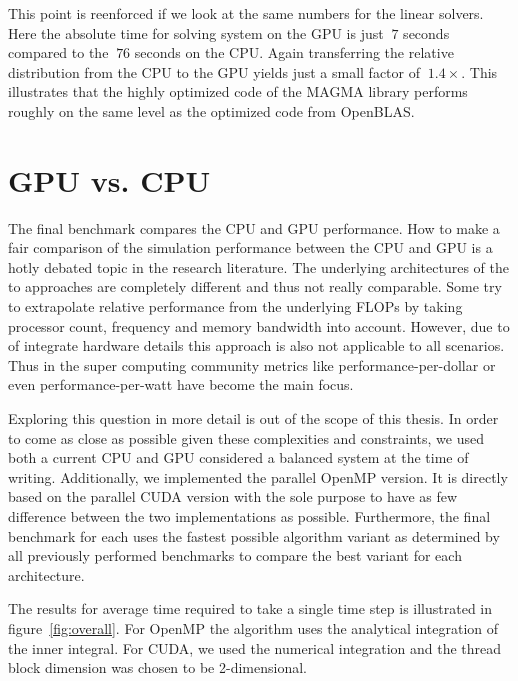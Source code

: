 \documentclass[a4paper,11pt]{kth-mag}
\begin{document}
This point is reenforced if we look at the same numbers for the linear solvers. Here the absolute time for solving system on the GPU is just $~7$ seconds compared to the $~76$ seconds on the CPU. Again transferring the relative distribution from the CPU to the GPU yields just a small factor of $~1.4×$. This illustrates that the highly optimized code of the MAGMA library performs roughly on the same level as the optimized code from OpenBLAS.

\section{GPU vs. CPU}

The final benchmark compares the CPU and GPU performance. How to make a fair comparison of the simulation performance between the CPU and GPU is a hotly debated topic in the research literature. The underlying architectures of the to approaches are completely different and thus not really comparable. Some try to extrapolate relative performance from the underlying FLOPs by taking processor count, frequency and memory bandwidth into account. However, due to of integrate hardware details this approach is also not applicable to all scenarios. Thus in the super computing community metrics like performance-per-dollar or even performance-per-watt have become the main focus.

Exploring this question in more detail is out of the scope of this thesis. In order to come as close as possible given these complexities and constraints, we used both a current CPU and GPU considered a balanced system at the time of writing. Additionally, we implemented the parallel OpenMP version. It is directly based on the parallel CUDA version with the sole purpose to have as few difference between the two implementations as possible. Furthermore, the final benchmark for each uses the fastest possible algorithm variant as determined by all previously performed benchmarks to compare the best variant for each architecture.

The results for average time required to take a single time step is illustrated in figure~\ref{fig:overall}. For OpenMP the algorithm uses the analytical integration of the inner integral. For CUDA, we used the numerical integration and the thread block dimension was chosen to be 2-dimensional.
\end{document}

